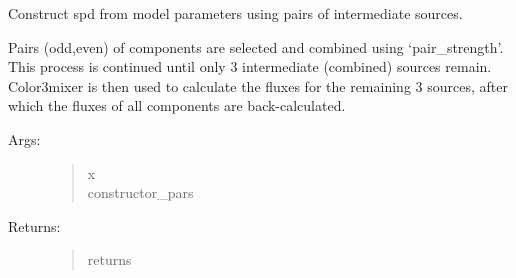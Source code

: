\documentclass[letterpaper,10pt,english]{sphinxmanual}
\begin{document}
\begin{fulllineitems}
\begin{description}
\begin{quote}
\begin{description}
\end{description}\end{quote}

\end{description}

\end{fulllineitems}


\begin{fulllineitems}
\label{\detokenize{toolboxes:luxpy.toolboxes.spdbuild.spd_constructor_2}}
Construct spd from model parameters using pairs of intermediate sources.

\begin{DUlineblock}{0em}
\item[] Pairs (odd,even) of components are selected and combined using 
‘pair\_strength’. This process is continued until only 3 intermediate 
(combined) sources remain. Color3mixer is then used to calculate the 
fluxes for the remaining 3 sources, after which the fluxes of all 
components are back-calculated.
\end{DUlineblock}
\begin{description}
\item[{Args:}] \leavevmode\begin{quote}\begin{description}
\item[{x}] \leavevmode
{}

\item[{constructor\_pars}] \leavevmode
{}

\end{description}\end{quote}

\item[{Returns:}] \leavevmode\begin{quote}\begin{description}
\item[{returns}] \leavevmode
{}


\end{description}
\end{quote}
\end{description}
\end{fulllineitems}
\end{document}
